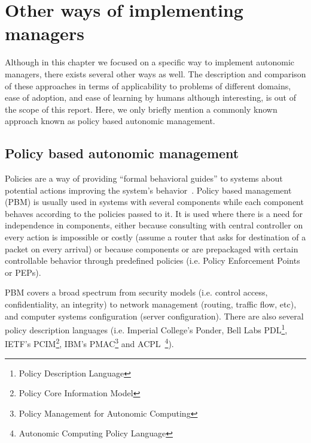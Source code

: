 \section{Other ways of implementing managers}
\label{sec:heuristic-regulators}
Although in this chapter we focused on a specific way to implement autonomic managers, there exists several other ways as well.
The description and comparison of these approaches in terms of applicability to problems of different domains, ease of adoption, and ease of learning by humans although interesting, is out of the scope of this report. Here, we only briefly mention a commonly known approach known as policy based autonomic management. 

\subsection{Policy based autonomic management }
Policies are a way of providing ``formal behavioral guides'' to systems about potential actions improving the system's behavior~\cite{KephartEtAlPolicy2004}. 
Policy based management (PBM) is usually used in systems with several components while each component behaves according to the policies passed to it. 
It is used where there is a need for independence in components, either because consulting with central controller on every action is impossible or costly (assume a router that asks for destination of a packet on every arrival) or because components or are prepackaged with certain controllable behavior through predefined policies (i.e. Policy Enforcement Points or PEPs). 

PBM covers a broad spectrum from 
security models (i.e. control access, confidentiality, an integrity)
to network management (routing, traffic flow,  etc),
and computer systems configuration (server configuration). 
There are also several policy description languages (i.e. Imperial College's Ponder, Bell Labs PDL\footnote{Policy Description Language}, IETF's  PCIM\footnote{Policy Core Information Model}, IBM's PMAC\footnote{Policy Management for Autonomic Computing} and ACPL~\footnote{Autonomic Computing Policy Language}).

